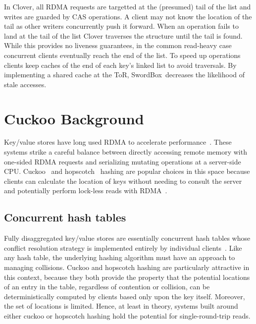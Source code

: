 \documentclass[12pt]{ucsddissertation}
\newcommand{\sword}{SwordBox}
\begin{document}
In Clover, all RDMA requests
are targetted at the (presumed) tail of the list and writes are
guarded by CAS operations. A client may not know the location of the
tail as other writers concurrently push it forward. When an operation
fails to land at the tail of the list Clover traverses the
structure until the tail is found. While this provides no liveness
guarantees, in the common read-heavy case concurrent clients
eventually reach the end of the list. To speed up operations clients
keep caches of the end of each key's linked list to
avoid traversals.
By implementing a shared cache at the ToR, \sword\ 
decreases the likelihood of stale accesses.



\section{Cuckoo Background}
\label{sec:background}



Key/value stores have long used RDMA to
accelerate
performance~\cite{farm,memc3,erpc,herd,faast,mica,pilaf,cell,storm}.
These systems strike a careful balance between directly accessing remote memory with one-sided RDMA requests and
serializing mutating operations at a server-side CPU.
Cuckoo~\cite{cuckoo} and hopscotch~\cite{hopscotch} hashing are popular choices in
this space because clients can calculate the location of
keys without needing to consult the server and potentially perform
lock-less reads with RDMA~\cite{farm,pilaf,cuckoo}.




\subsection{Concurrent hash tables} 
\label{sec:cuckoo-back}

Fully disaggregated key/value stores are essentially concurrent hash
tables whose conflict resolution strategy is implemented entirely by
individual clients~\cite{rolex,fusee,race}.  Like any hash table, the
underlying hashing algorithm must have an approach to managing
collisions. Cuckoo and hopscotch hashing are particularly attractive
in this context, because they both provide the property that the
potential locations of an entry in the table, regardless of
contention or collision, can be deterministically computed by clients
based only upon the key itself.  Moreover, the set of locations is
limited.  Hence, at least in theory, systems built around either
cuckoo or hopscotch hashing hold the potential for single-round-trip
reads.
\end{document}
